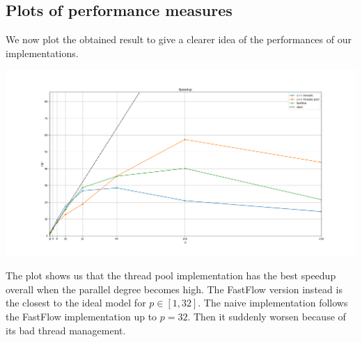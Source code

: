 \documentclass[11pt]{article}
\begin{document}
\subsection{Plots of performance measures}
We now plot the obtained result to give a clearer idea of the performances of our implementations.

\begin{center}
	\begin{minipage}{\textwidth}
		\includegraphics[width=\linewidth]{plots/SPEEDUP-10-1024-10000.png}
	\end{minipage}
\end{center}
The plot shows us that the thread pool implementation has the best speedup overall when the parallel degree becomes high. The FastFlow version instead is the closest to the ideal model for $ p \in [1,32] $. The naive implementation follows the FastFlow implementation up to $ p=32 $. Then it suddenly worsen because of its bad thread management. \\
\end{document}
